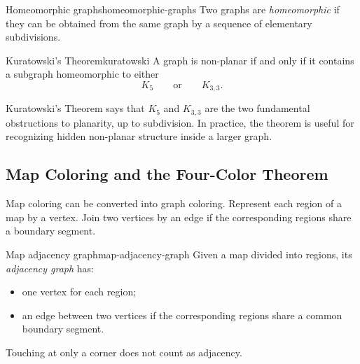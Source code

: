 \begin{definition}{Homeomorphic graphs}{homeomorphic-graphs}
Two graphs are \emph{homeomorphic} if they can be obtained from the same graph by a sequence of elementary subdivisions.
\end{definition}

\begin{center}
\end{center}

\begin{theorem}{Kuratowski's Theorem}{kuratowski}
A graph is non-planar if and only if it contains a subgraph homeomorphic to either
\[
K_5
\qquad\text{or}\qquad
K_{3,3}.
\]
\end{theorem}

\begin{extension}[title={How to interpret Kuratowski's Theorem}]
Kuratowski's Theorem says that \(K_5\) and \(K_{3,3}\) are the two fundamental obstructions to planarity, up to subdivision. In practice, the theorem is useful for recognizing hidden non-planar structure inside a larger graph.
\end{extension}

\subsection{Map Coloring and the Four-Color Theorem}

Map coloring can be converted into graph coloring. Represent each region of a map by a vertex. Join two vertices by an edge if the corresponding regions share a boundary segment.

\begin{definition}{Map adjacency graph}{map-adjacency-graph}
Given a map divided into regions, its \emph{adjacency graph} has:
\begin{itemize}[leftmargin=*]
    \item one vertex for each region;
    \item an edge between two vertices if the corresponding regions share a common boundary segment.
\end{itemize}
Touching at only a corner does not count as adjacency.
\end{definition}

